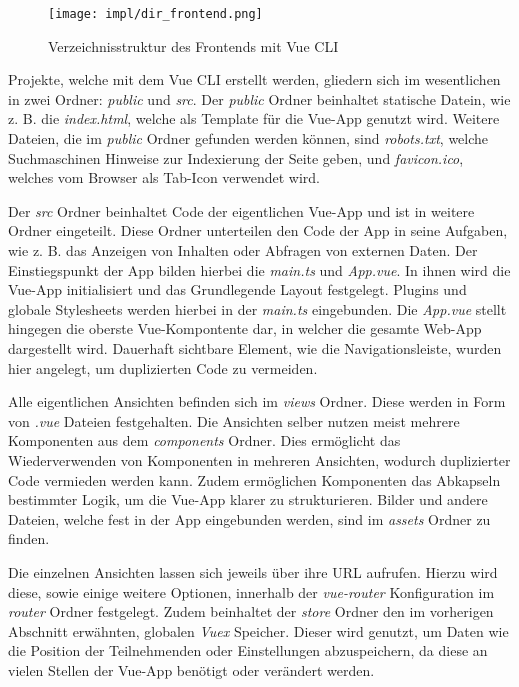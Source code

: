 \begin{figure}[htpb]
    \centering
    \texttt{[image: impl/dir\_frontend.png]}
    \caption{Verzeichnisstruktur des Frontends mit Vue CLI}
    \label{fig:impl-frontend-vuecli-dir}
\end{figure}

Projekte, welche mit dem Vue CLI erstellt werden, gliedern sich im wesentlichen
in zwei Ordner: \textit{public} und \textit{src}. Der \textit{public} Ordner
beinhaltet statische Datein, wie z. B. die \textit{index.html}, welche als
Template für die Vue-App genutzt wird. Weitere Dateien, die im \textit{public}
Ordner gefunden werden können, sind \textit{robots.txt}, welche
Suchmaschinen Hinweise zur Indexierung der Seite geben, und
\textit{favicon.ico}, welches vom Browser als Tab-Icon verwendet wird.

Der \textit{src} Ordner beinhaltet Code der eigentlichen Vue-App und ist in
weitere Ordner eingeteilt. Diese Ordner unterteilen den Code der App in seine
Aufgaben, wie z. B. das Anzeigen von Inhalten oder Abfragen von externen Daten.
Der Einstiegspunkt der App bilden hierbei die \textit{main.ts} und
\textit{App.vue}. In ihnen wird die Vue-App initialisiert und das Grundlegende
Layout festgelegt. Plugins und globale Stylesheets werden hierbei in der
\textit{main.ts} eingebunden. Die \textit{App.vue} stellt hingegen die oberste
Vue-Kompontente dar, in welcher die gesamte Web-App dargestellt wird. Dauerhaft
sichtbare Element, wie die Navigationsleiste, wurden hier angelegt, um
duplizierten Code zu vermeiden.

Alle eigentlichen Ansichten befinden sich im \textit{views} Ordner. Diese werden
in Form von \textit{.vue} Dateien festgehalten. Die Ansichten selber nutzen
meist mehrere Komponenten aus dem \textit{components} Ordner. Dies ermöglicht
das Wiederverwenden von Komponenten in mehreren Ansichten, wodurch duplizierter
Code vermieden werden kann. Zudem ermöglichen Komponenten das Abkapseln
bestimmter Logik, um die Vue-App klarer zu strukturieren. Bilder und andere
Dateien, welche fest in der App eingebunden werden, sind im \textit{assets}
Ordner zu finden.

Die einzelnen Ansichten lassen sich jeweils über ihre URL aufrufen. Hierzu wird
diese, sowie einige weitere Optionen, innerhalb der \textit{vue-router}
Konfiguration im \textit{router} Ordner festgelegt. Zudem beinhaltet der
\textit{store} Ordner den im vorherigen Abschnitt erwähnten, globalen
\textit{Vuex} Speicher. Dieser wird genutzt, um Daten wie die Position der
Teilnehmenden oder Einstellungen abzuspeichern, da diese an vielen Stellen der
Vue-App benötigt oder verändert werden.

